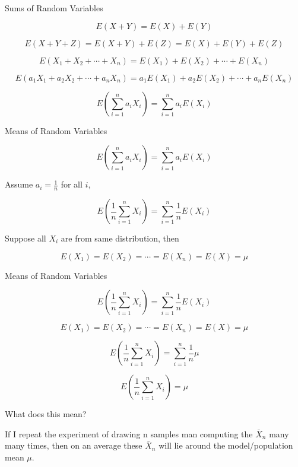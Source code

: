 \documentclass{beamer}\usepackage[]{graphicx}\usepackage[]{color}
\begin{document}
\begin{frame}{Sums of Random Variables}

$$ E(X+Y) =  E(X) + E(Y) $$

$$ E(X + Y + Z) = E(X+Y) + E(Z) = E(X) + E(Y) + E(Z) $$

$$ E( X_1 + X_2 + \cdots + X_n ) = E(X_1) + E(X_2) + \cdots + E(X_n) $$

$$ E( a_1X_1 + a_2X_2 + \cdots + a_nX_n ) = a_1E(X_1) + a_2E(X_2) + \cdots + a_nE(X_n) $$

$$ E \left ( \sum_{i=1}^{n} a_iX_i \right ) = \sum_{i=1}^{n} a_i E(X_{i}) $$

 \end{frame}

\begin{frame}{Means of Random Variables}

$$ E \left ( \sum_{i=1}^{n} a_iX_i \right ) = \sum_{i=1}^{n} a_i E(X_{i}) $$

Assume $a_i = \frac{1}{n}$ for all $i$,

$$ E \left ( \frac{1}{n} \sum_{i=1}^{n} X_i \right ) = \sum_{i=1}^{n} \frac{1}{n} E(X_{i}) $$

Suppose all $X_i$ are from same distribution, then 

$$ E(X_1) = E(X_2) = \cdots = E(X_n) = E(X)= \mu$$

 \end{frame}

\begin{frame}{Means of Random Variables}

$$ E \left ( \frac{1}{n} \sum_{i=1}^{n} X_i \right ) = \sum_{i=1}^{n} \frac{1}{n} E(X_{i}) $$

$$ E(X_1) = E(X_2) = \cdots = E(X_n) = E(X)= \mu$$

$$ E \left ( \frac{1}{n} \sum_{i=1}^{n} X_i \right ) = \sum_{i=1}^{n} \frac{1}{n} \mu $$

$$ E \left ( \frac{1}{n} \sum_{i=1}^{n} X_i \right ) = \mu $$

What does this mean? 

If I repeat the experiment of drawing n samples man computing the $\bar{X}_{n}$ many many times, then on an average these $\bar{X}_{n}$ will lie around the model/population mean $\mu$.

 \end{frame}
\end{document}
